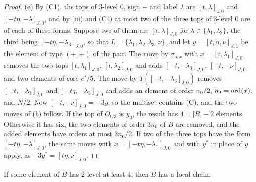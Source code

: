 \begin{proof}
(e) By (C1), the tops of $3$-level $0$, sign $+$ and label $\lambda$ are
$[t,\lambda]_{J,0}$ and $[-t\eta,-\lambda]_{J,0}$, and by
(iii) and (C4) at most two of the three tops of
$3$-level $0$ are of each of these forms. Suppose two of them are
$[t,\lambda]_{J,0}$ for $\lambda\in\{\lambda_{1},\lambda_{2}\}$, the third
being $[-t\eta,-\lambda_{3}]_{J,0}$, so that $L=\{\lambda_{1},\lambda_{2},
\lambda_{3},\nu\}$, and let $y=[t,\alpha,\nu]_{J,1}$ be the element of type
$(+,+)$ of the pair. The move by $\sigma_{5,x}$ with $x=[t,\lambda_{1}]_{J,0}$
removes the two tops $[t,\lambda_{1}]_{J,0}$, $[t,\lambda_{2}]_{J,0}$ and adds
$[-t,-\lambda_{3}]_{J,0}$, $[-t,-\nu]_{J,0}$ and two elements of core
$e'/5$. The move by $T([-t,-\lambda_{3}]_{J,0})$ removes
$[-t,-\lambda_{3}]_{J,0}$ and $[-t\eta,-\lambda_{3}]_{J,0}$ and adds an
element of order $n_{0}/2$, $n_{0}=\operatorname{ord}(x)$, and $N/2$. Now
$[-t,-\nu]_{J,0}=-3y$, so the multiset contains (C), and the two moves of (b)
follow. If the top of $O_{t/3}$ is $y_{0}$, the result has $4=|B|-2$
elements. Otherwise it has six, the two elements of order $3n_{0}$ of $B$ are
removed, and the added elements have orders at most $3n_{0}/2$. If two of
the three tops have the form $[-t\eta,-\lambda]_{J,0}$, the same moves with
$x=[-t\eta,-\lambda_{1}]_{J,0}$ and with $y^{*}$ in place of $y$ apply, as
$-3y^{*}=[t\eta,\nu]_{J,0}$.
\end{proof}

\begin{proposition}\label{prop:twolevel}
If some element of $B$ has $2$-level at least $4$, then $B$ has a local
chain.
\end{proposition}

